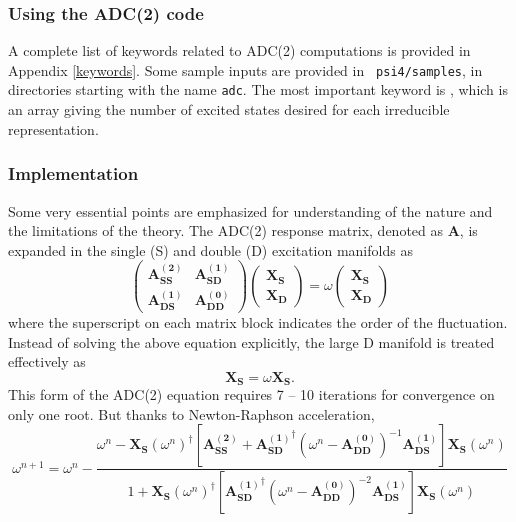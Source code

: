 \subsubsection{Using the ADC(2) code}
A complete list of keywords related to ADC(2) computations is provided in
Appendix \ref{keywords}.  Some sample inputs are provided in {\tt
psi4/samples}, in directories starting with the name {\tt adc}.  The most
important keyword is , which is an array
giving the number of excited states desired for each irreducible
representation.

\subsubsection{Implementation}
Some very essential points are emphasized for understanding of the
nature and the limitations of the theory. The ADC(2) response matrix,
denoted as $\mathbf{A}$, is expanded in the single (S) and double (D)
excitation manifolds as
\begin{equation*}
\begin{pmatrix}
\mathbf{A_{SS}^{(2)}} & \mathbf{A_{SD}^{(1)}}\\
\mathbf{A_{DS}^{(1)}} & \mathbf{A_{DD}^{(0)}}
\end{pmatrix}
\begin{pmatrix}
\mathbf{X_S}\\
\mathbf{X_D}
\end{pmatrix}
=\omega
\begin{pmatrix}
\mathbf{X_S}\\
\mathbf{X_D}
\end{pmatrix}
\end{equation*}
where the superscript on each matrix block indicates the order of
the fluctuation. Instead of solving the above equation explicitly,
the large D manifold is treated effectively as
\begin{equation*}
[\mathbf{A_{SS}^{(2)}}+\mathbf{A_{SD}^{(1)}}^{\dagger}(\omega-\mathbf{A_{DD}^{(0)}})^{-1}\mathbf{A_{DS}^{(1)}}]\mathbf{X_{S}}=\omega\mathbf{X_{S}}.
\end{equation*}
This form of the ADC(2) equation requires 7 -- 10 iterations for
convergence on only one root. But thanks to Newton-Raphson
acceleration,
\begin{equation*}
\omega^{n+1}=\omega^{n}-\frac{\omega^n-\mathbf{X_{S}}(\omega^n)^{\dagger}[\mathbf{A_{SS}^{(2)}}+\mathbf{A_{SD}^{(1)}}^{\dagger}(\omega^n-\mathbf{A_{DD}^{(0)}})^{-1}\mathbf{A_{DS}^{(1)}}]\mathbf{X_{S}}(\omega^n)}{1+\mathbf{X_{S}}(\omega^n)^{\dagger}[\mathbf{A_{SD}^{(1)}}^{\dagger}(\omega^n-\mathbf{A_{DD}^{(0)}})^{-2}\mathbf{A_{DS}^{(1)}}]\mathbf{X_{S}}(\omega^n)}
\end{equation*}
